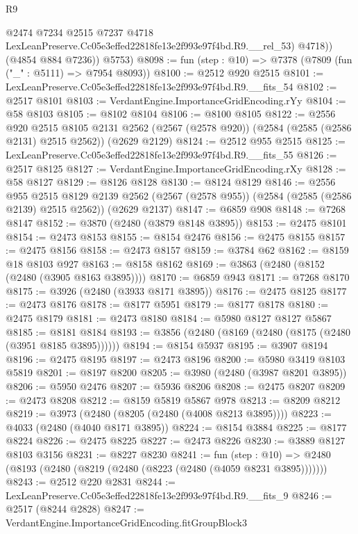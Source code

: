 \begin{lexlean}{R9}
\begin{coremodule}
              @2474
              @7234
              @2515
              @7237
              @4718
              LexLeanPreserve.Cc05e3effed22818fe13e2f993e97f4bd.R9.__rel_53)
            @4718))
        (@4854 @884 @7236))
      @5753)
@8098 := fun (step : @10) => @7378 (@7809 (fun ("_" : @5111) => @7954 @8093))
@8100 := @2512 @920 @2515
@8101 := LexLeanPreserve.Cc05e3effed22818fe13e2f993e97f4bd.R9.__fits_54
@8102 := @2517 @8101
@8103 := VerdantEngine.ImportanceGridEncoding.rYy
@8104 := @58 @8103
@8105 := @8102 @8104
@8106 := @8100 @8105
@8122 := @2556
    @920
    @2515
    @8105
    @2131
    @2562
    (@2567 (@2578 @920))
    (@2584 (@2585 (@2586 @2131) @2515 @2562))
    (@2629 @2129)
@8124 := @2512 @955 @2515
@8125 := LexLeanPreserve.Cc05e3effed22818fe13e2f993e97f4bd.R9.__fits_55
@8126 := @2517 @8125
@8127 := VerdantEngine.ImportanceGridEncoding.rXy
@8128 := @58 @8127
@8129 := @8126 @8128
@8130 := @8124 @8129
@8146 := @2556
    @955
    @2515
    @8129
    @2139
    @2562
    (@2567 (@2578 @955))
    (@2584 (@2585 (@2586 @2139) @2515 @2562))
    (@2629 @2137)
@8147 := @6859 @908
@8148 := @7268 @8147
@8152 := @3870 (@2480 (@3879 @8148 @3895))
@8153 := @2475 @8101
@8154 := @2473 @8153
@8155 := @8154 @2476
@8156 := @2475 @8155
@8157 := @2475 @8156
@8158 := @2473 @8157
@8159 := @3784 @62
@8162 := @8159 @18 @8103 @927
@8163 := @8158 @8162
@8169 := @3863 (@2480 (@8152 (@2480 (@3905 @8163 @3895))))
@8170 := @6859 @943
@8171 := @7268 @8170
@8175 := @3926 (@2480 (@3933 @8171 @3895))
@8176 := @2475 @8125
@8177 := @2473 @8176
@8178 := @8177 @5951
@8179 := @8177 @8178
@8180 := @2475 @8179
@8181 := @2473 @8180
@8184 := @5980 @8127 @8127 @5867
@8185 := @8181 @8184
@8193 := @3856 (@2480 (@8169 (@2480 (@8175 (@2480 (@3951 @8185 @3895))))))
@8194 := @8154 @5937
@8195 := @3907 @8194
@8196 := @2475 @8195
@8197 := @2473 @8196
@8200 := @5980 @3419 @8103 @5819
@8201 := @8197 @8200
@8205 := @3980 (@2480 (@3987 @8201 @3895))
@8206 := @5950 @2476
@8207 := @5936 @8206
@8208 := @2475 @8207
@8209 := @2473 @8208
@8212 := @8159 @5819 @5867 @978
@8213 := @8209 @8212
@8219 := @3973 (@2480 (@8205 (@2480 (@4008 @8213 @3895))))
@8223 := @4033 (@2480 (@4040 @8171 @3895))
@8224 := @8154 @3884
@8225 := @8177 @8224
@8226 := @2475 @8225
@8227 := @2473 @8226
@8230 := @3889 @8127 @8103 @3156
@8231 := @8227 @8230
@8241 := fun (step : @10) =>
  @2480 (@8193 (@2480 (@8219 (@2480 (@8223 (@2480 (@4059 @8231 @3895)))))))
@8243 := @2512 @220 @2831
@8244 := LexLeanPreserve.Cc05e3effed22818fe13e2f993e97f4bd.R9.__fits_9
@8246 := @2517 (@8244 @2828)
@8247 := VerdantEngine.ImportanceGridEncoding.fitGroupBlock3

\end{coremodule}
\end{lexlean}
